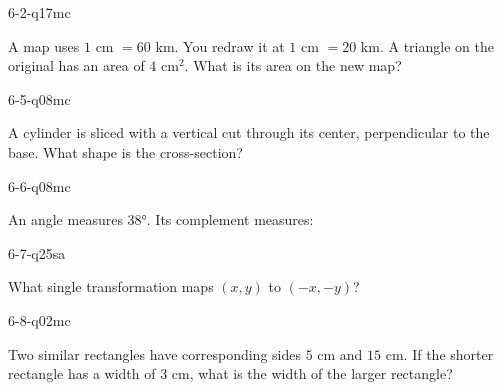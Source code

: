 \begin{practiceQuestion}{6-2-q17}{mc}
\begin{questionText}
A map uses $1$ cm $= 60$ km. You redraw it at $1$ cm $= 20$ km. A triangle on the original has an area of $4$ cm$^2$. What is its area on the new map?
\end{questionText}
\end{practiceQuestion}

\begin{practiceQuestion}{6-5-q08}{mc}
\begin{questionText}
A cylinder is sliced with a vertical cut through its center, perpendicular to the base. What shape is the cross-section?
\end{questionText}
\end{practiceQuestion}

\begin{practiceQuestion}{6-6-q08}{mc}
\begin{questionText}
An angle measures $38°$. Its complement measures:
\end{questionText}
\end{practiceQuestion}

\begin{practiceQuestion}{6-7-q25}{sa}
\begin{questionText}
What single transformation maps $(x, y)$ to $(-x, -y)$?
\end{questionText}
\end{practiceQuestion}

\begin{practiceQuestion}{6-8-q02}{mc}
\begin{questionText}
Two similar rectangles have corresponding sides $5$ cm and $15$ cm. If the shorter rectangle has a width of $3$ cm, what is the width of the larger rectangle?
\end{questionText}
\end{practiceQuestion}

